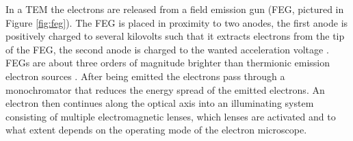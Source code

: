 In a TEM the electrons are released from a field emission gun (FEG, pictured in Figure \ref{fig:feg}). 
The FEG is placed in proximity to two anodes, the first anode is positively charged to several kilovolts such that it extracts electrons from the tip of the FEG, the second anode is charged to the wanted acceleration voltage \cite{Williams2009-ww}.
FEGs are about three orders of magnitude brighter than thermionic emission electron sources \cite{field-emission}.
After being emitted the electrons pass through a monochromator that reduces the energy spread of the emitted electrons. An electron then continues along the optical axis into an illuminating system consisting of multiple electromagnetic lenses, which lenses are activated and to what extent depends on the operating mode of the electron microscope.

